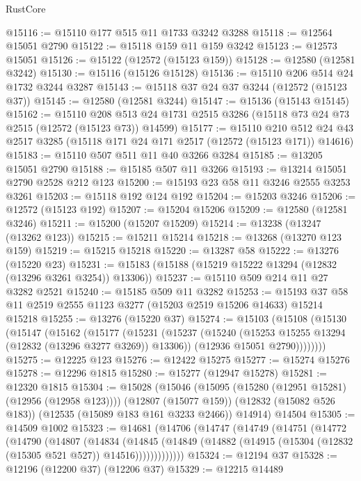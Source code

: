 \begin{lexlean}{RustCore}
\begin{coremodule}
@15116 := @15110 @177 @515 @11 @1733 @3242 @3288
@15118 := @12564 @15051 @2790
@15122 := @15118 @159 @11 @159 @3242
@15123 := @12573 @15051
@15126 := @15122 (@12572 (@15123 @159))
@15128 := @12580 (@12581 @3242)
@15130 := @15116 (@15126 @15128)
@15136 := @15110 @206 @514 @24 @1732 @3244 @3287
@15143 := @15118 @37 @24 @37 @3244 (@12572 (@15123 @37))
@15145 := @12580 (@12581 @3244)
@15147 := @15136 (@15143 @15145)
@15162 := @15110
    @208
    @513
    @24
    @1731
    @2515
    @3286
    (@15118 @73 @24 @73 @2515 (@12572 (@15123 @73)) @14599)
@15177 := @15110
    @210
    @512
    @24
    @43
    @2517
    @3285
    (@15118 @171 @24 @171 @2517 (@12572 (@15123 @171)) @14616)
@15183 := @15110 @507 @511 @11 @40 @3266 @3284
@15185 := @13205 @15051 @2790
@15188 := @15185 @507 @11 @3266
@15193 := @13214 @15051 @2790 @2528 @212 @123
@15200 := @15193 @23 @58 @11 @3246 @2555 @3253 @3261
@15203 := @15118 @192 @124 @192
@15204 := @15203 @3246
@15206 := @12572 (@15123 @192)
@15207 := @15204 @15206
@15209 := @12580 (@12581 @3246)
@15211 := @15200 (@15207 @15209)
@15214 := @13238 (@13247 (@13262 @123))
@15215 := @15211 @15214
@15218 := @13268 (@13270 @123 @159)
@15219 := @15215 @15218
@15220 := @13287 @58
@15222 := @13276 (@15220 @23)
@15231 := @15183 (@15188 (@15219 @15222 @13294 (@12832 (@13296 @3261 @3254)) @13306))
@15237 := @15110 @509 @214 @11 @27 @3282 @2521
@15240 := @15185 @509 @11 @3282
@15253 := @15193 @37 @58 @11 @2519 @2555 @1123 @3277 (@15203 @2519 @15206 @14633) @15214 @15218
@15255 := @13276 (@15220 @37)
@15274 := @15103
    (@15108
      (@15130
        (@15147
          (@15162
            (@15177
              (@15231
                (@15237
                  (@15240 (@15253 @15255 @13294 (@12832 (@13296 @3277 @3269)) @13306))
                  (@12936 @15051 @2790))))))))
@15275 := @12225 @123
@15276 := @12422 @15275
@15277 := @15274 @15276
@15278 := @12296 @1815
@15280 := @15277 (@12947 @15278)
@15281 := @12320 @1815
@15304 := @15028
    (@15046
      (@15095 (@15280 (@12951 @15281) (@12956 (@12958 @123))))
      (@12807 (@15077 @159))
      (@12832 (@15082 @526 @183))
      (@12535 (@15089 @183 @161 @3233 @2466))
      @14914)
    @14504
@15305 := @14509 @1002
@15323 := @14681
    (@14706
      (@14747
        (@14749
          (@14751
            (@14772
              (@14790
                (@14807
                  (@14834
                    (@14845
                      (@14849
                        (@14882 (@14915 (@15304 (@12832 (@15305 @521 @527)) @14516)))))))))))))
@15324 := @12194 @37
@15328 := @12196 (@12200 @37) (@12206 @37)
@15329 := @12215 @14489

\end{coremodule}
\end{lexlean}
